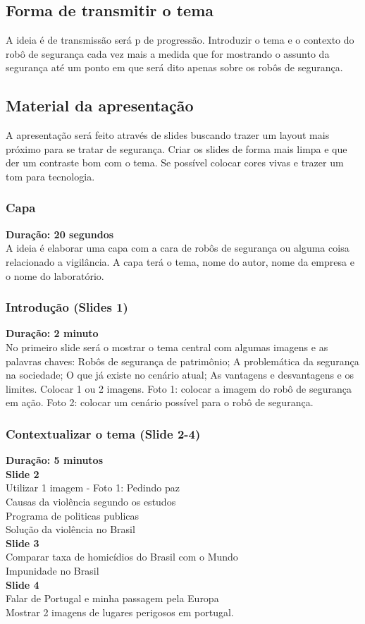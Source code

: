 \documentclass[12pt,a4paper]{article}
\begin{document}
    \subsection{Forma de transmitir o tema}
    A ideia é de transmissão será p de progressão. Introduzir o tema e o contexto do robô de segurança cada vez mais a medida que for mostrando o assunto da segurança até um ponto em que será dito apenas sobre os robôs de segurança. 

    \subsection{Material da apresentação}
    A apresentação será feito através de slides buscando trazer um layout mais próximo para se tratar de segurança. Criar os slides de forma mais limpa e que der um contraste bom com o tema. Se possível colocar cores vivas e trazer um tom para tecnologia. 

    \subsubsection{Capa}
    \textbf{Duração: 20 segundos} \\
    A ideia é elaborar uma capa com a cara de robôs de segurança ou alguma coisa relacionado a vigilância. A capa terá o tema, nome do autor, nome da empresa e o nome do laboratório.

    \subsubsection{Introdução (Slides 1)}
    \textbf{Duração: 2 minuto} \\
    No primeiro slide será o mostrar o tema central com algumas imagens e as palavras chaves: Robôs de segurança de patrimônio; A problemática da segurança na sociedade;  O que já existe no cenário atual; As vantagens e desvantagens e os limites. Colocar 1 ou 2 imagens. Foto 1: colocar a imagem do robô de segurança em ação. Foto 2: colocar um cenário possível para o robô de segurança.

    \subsubsection{Contextualizar o tema (Slide 2-4)}
    \textbf{Duração: 5 minutos} \\
    \textbf{Slide 2} \\
    Utilizar 1 imagem - Foto 1: Pedindo paz \\
    Causas da violência segundo os estudos \\
    Programa de politicas publicas \\
    Solução da violência no Brasil \\
    \textbf{Slide 3} \\
    Comparar taxa de homicídios do Brasil com o Mundo \\
    Impunidade no Brasil \\
    \textbf{Slide 4} \\
    Falar de Portugal e minha passagem pela Europa \\
    Mostrar 2 imagens de lugares perigosos em portugal. \\
\end{document}

